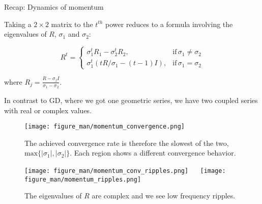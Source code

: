 \documentclass[11pt,compress,t,notes=noshow, xcolor=table]{beamer}
\begin{document}
\begin{vbframe}{Recap: Dynamics of momentum}
\framebreak

Taking a $2 \times 2$ matrix to the $t^{th}$ power reduces to a formula involving the eigenvalues of $R$, $\sigma_1$ and $\sigma_2$:

$$
R^t=\begin{cases}
\sigma_1^t R_1 - \sigma_2^t R_2, & \text{if} \, \sigma_1 \neq \sigma_2 \\
\sigma_1^t (t R/\sigma_1 - (t-1) I), & \text{if} \, \sigma_1 = \sigma_2 
\end{cases}
$$

where $R_j = \frac{R - \sigma_j I}{\sigma_1 - \sigma_2}$.


\vspace*{1.5cm}	
In contrast to GD, where we got one geometric series, we have two coupled series with real or complex values.

\framebreak
\begin{figure}
	\texttt{[image: figure\_man/momentum\_convergence.png]} \\
	\begin{footnotesize} 
		The achieved convergence rate is therefore the slowest of the two, $\text{max} \{|\sigma_1|, |\sigma_2| \}$. Each region shows a different convergence behavior. 
	\end{footnotesize}
\end{figure}

\framebreak


\framebreak
\vspace*{1.0cm}
\begin{figure}
	\texttt{[image: figure\_man/momentum\_conv\_ripples.png]} ~~ \texttt{[image: figure\_man/momentum\_ripples.png]} \\
	\begin{footnotesize} 
		The eigenvalues of $R$ are complex and we see low frequency ripples. 
	\end{footnotesize}
\end{figure}


\end{vbframe}
\end{document}
